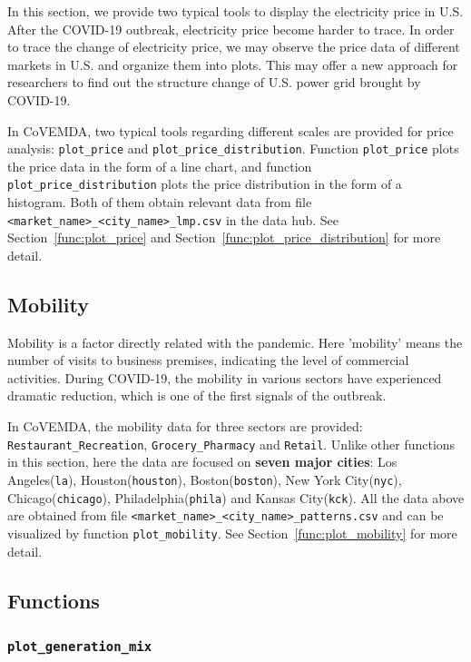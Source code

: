 \documentclass[10pt]{article}
\newcommand{\covemda}{CoVEMDA}
\numberwithin{equation}{section}
\numberwithin{table}{section}
\numberwithin{figure}{section}
\begin{document}
In this section, we provide two typical tools to display the electricity price in U.S. After the COVID-19 outbreak, electricity price become harder to trace. In order to trace the change of electricity price, we may observe the price data of different markets in U.S. and organize them into plots. This may offer a new approach for researchers to find out the structure change of U.S. power grid brought by COVID-19.

In \covemda{}, two typical tools regarding different scales are provided for price analysis: \verb!plot_price! and \verb!plot_price_distribution!. Function \verb!plot_price! plots the price data in the form of a line chart, and function \verb!plot_price_distribution! plots the price distribution in the form of a histogram. Both of them obtain relevant data from file \\\verb!<market_name>_<city_name>_lmp.csv! in the data hub. See Section~\ref{func:plot_price} and Section~\ref{func:plot_price_distribution} for more detail.



\subsection{Mobility}

Mobility is a factor directly related with the pandemic. Here 'mobility' means the number of visits to business premises, indicating the level of commercial activities. During COVID-19, the mobility in various sectors have experienced dramatic reduction, which is one of the first signals of the outbreak.

In \covemda{}, the mobility data for three sectors are provided: \verb!Restaurant_Recreation!, \verb!Grocery_Pharmacy! and \verb!Retail!. Unlike other functions in this section, here the data are focused on \textbf{seven major cities}: Los Angeles(\verb!la!), Houston(\verb!houston!), Boston(\verb!boston!), New York City(\verb!nyc!), Chicago(\verb!chicago!), Philadelphia(\verb!phila!) and Kansas City(\verb!kck!). All the data above are obtained from file \verb!<market_name>_<city_name>_patterns.csv! and can be visualized by function \verb!plot_mobility!. See Section~\ref{func:plot_mobility} for more detail.



\subsection{Functions}

\subsubsection{\texttt{plot\_generation\_mix}}\label{func:plot_generation_mix}
\end{document}
